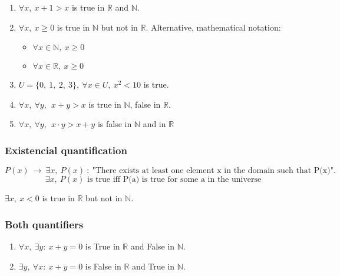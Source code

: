 \documentclass[12pt, a4paper]{book}
\begin{document}
\begin{exmp}
    \begin{enumerate}
        \item $\forall x, \ x+1 > x$ is true in $\mathbb{R}$ and $\mathbb{N}$.
        \item $\forall x, \ x \geq 0$ is true in $\mathbb{N}$ but not in $\mathbb{R}$. Alternative, mathematical notation: 
        \begin{itemize}
            \item $\forall x \in \mathbb{N}, \ x \geq 0$
            \item $\forall x \in \mathbb{R}, \ x \geq 0$
        \end{itemize}
        \item $U= \{0, \ 1, \ 2, \ 3 \}, \ \forall x \in U, \ x^2<10$ is true.
        \item $\forall x, \ \forall y, \ \ x+y>x$ is true in $\mathbb{N}$, false in $\mathbb{R}$.
        \item $\forall x, \ \forall y, \ \ x \cdot y >x+y$ is false in $\mathbb{N}$ and in $\mathbb{R}$
    \end{enumerate}
\end{exmp}

\subsubsection*{Existencial quantification}

$$P(x) \ \rightarrow \ \exists x, \ P(x) \ : \ \text{"There exists at least one element x in the domain such that P(x)"}.$$
$$\exists x, \ P(x) \text{ is true iff P(a) is true for some a in the universe}$$

\begin{exmp}
    $\exists x, \ x<0$ is true in $\mathbb{R}$ but not in $\mathbb{N}$.
\end{exmp}

\subsubsection*{Both quantifiers}
\begin{exmp}
    \begin{enumerate}
        \item $\forall x, \ \exists y: \ x+y=0$ is True in $\mathbb{R}$ and False in $\mathbb{N}$.
        \item $\exists y, \ \forall x: \ x+y=0$ is False in $\mathbb{R}$ and True in $\mathbb{N}$.
    \end{enumerate}
\end{exmp}
\end{document}
